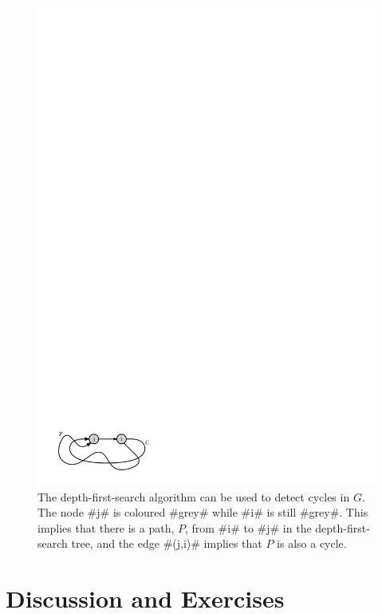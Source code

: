 \begin{figure}
	\begin{center}
		\includegraphics[scale=0.90909]{figs/dfs-cycle}
	\end{center}
	\caption[Cycle detection]{The depth-first-search algorithm can be used to detect cycles
		in $G$. The node #j# is coloured #grey# while #i# is still #grey#.  This
		implies that there is a path, $P$, from #i# to #j# in the depth-first-search
		tree, and the edge #(j,i)# implies that $P$ is also a cycle.}
\end{figure}

\section{Discussion and Exercises}

